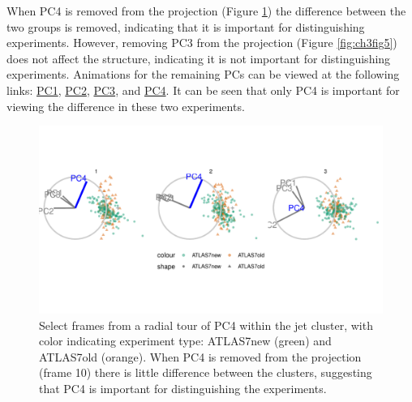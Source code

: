 \documentclass{template/monashthesis}
\begin{document}
When PC4 is removed from the projection (Figure \ref{fig:ch3fig4}) the difference between the two groups is removed, indicating that it is important for distinguishing experiments. However, removing PC3 from the projection (Figure \ref{fig:ch3fig5}) does not affect the structure, indicating it is not important for distinguishing experiments. Animations for the remaining PCs can be viewed at the following links: \href{https://github.com/nspyrison/spinifex_paper/blob/master/paper/gifs/jetcluster_manualtour_pc1.gif}{PC1}, \href{https://github.com/nspyrison/spinifex_paper/blob/master/paper/gifs/jetcluster_manualtour_pc2.gif}{PC2}, \href{https://github.com/nspyrison/spinifex_paper/blob/master/paper/gifs/jetcluster_manualtour_pc3.gif}{PC3}, and \href{https://github.com/nspyrison/spinifex_paper/blob/master/paper/gifs/jetcluster_manualtour_pc4.gif}{PC4}. It can be seen that only PC4 is important for viewing the difference in these two experiments.

\begin{figure}

{\centering \includegraphics[width=1\linewidth,]{./figures_from_script/ch3_fig4_jet_better_pc4} 

}

\caption{Select frames from a radial tour of PC4 within the jet cluster, with color indicating experiment type: ATLAS7new (green) and ATLAS7old (orange). When PC4 is removed from the projection (frame 10) there is little difference between the clusters, suggesting that PC4 is important for distinguishing the experiments.}\label{fig:ch3fig4}
\end{figure}
\end{document}
